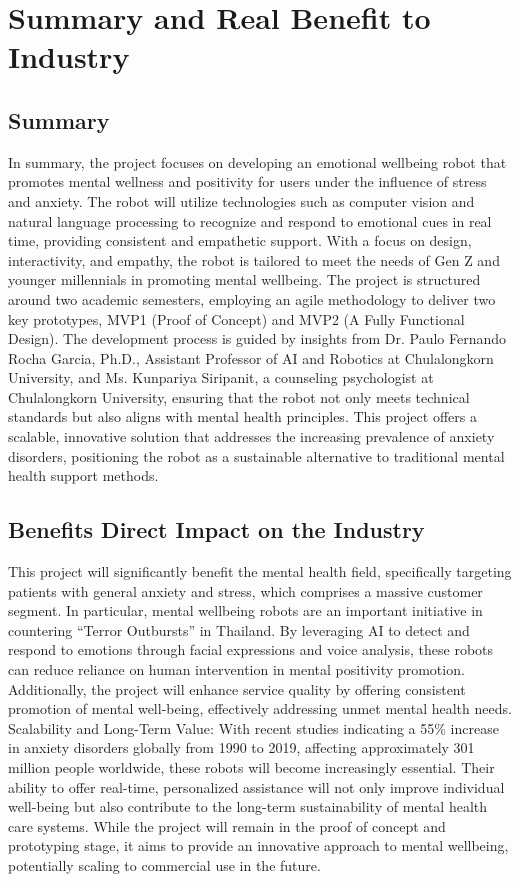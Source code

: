 \section{Summary and Real Benefit to Industry}
\subsection{Summary}
In summary, the project focuses on developing an emotional wellbeing robot that promotes mental wellness and positivity for users under the influence of stress and anxiety. The robot will utilize technologies such as computer vision and natural language processing to recognize and respond to emotional cues in real time, providing consistent and empathetic support. With a focus on design, interactivity, and empathy, the robot is tailored to meet the needs of Gen Z and younger millennials in promoting mental wellbeing. The project is structured around two academic semesters, employing an agile methodology to deliver two key prototypes, MVP1 (Proof of Concept) and MVP2 (A Fully Functional Design). The development process is guided by insights from Dr. Paulo Fernando Rocha Garcia, Ph.D., Assistant Professor of AI and Robotics at Chulalongkorn University, and Ms. Kunpariya Siripanit, a counseling psychologist at Chulalongkorn University, ensuring that the robot not only meets technical standards but also aligns with mental health principles. This project offers a scalable, innovative solution that addresses the increasing prevalence of anxiety disorders, positioning the robot as a sustainable alternative to traditional mental health support methods. 
\subsection{Benefits Direct Impact on the Industry}
This project will significantly benefit the mental health field, specifically targeting patients with general anxiety and stress, which comprises a massive customer segment. In particular, mental wellbeing robots are an important initiative in countering “Terror Outbursts” in Thailand. By leveraging AI to detect and respond to emotions through facial expressions and voice analysis, these robots can reduce reliance on human intervention in mental positivity promotion. Additionally, the project will enhance service quality by offering consistent promotion of mental well-being, effectively addressing unmet mental health needs. Scalability and Long-Term Value: With recent studies indicating a 55\% increase in anxiety disorders globally from 1990 to 2019, affecting approximately 301 million people worldwide, these robots will become increasingly essential. Their ability to offer real-time, personalized assistance will not only improve individual well-being but also contribute to the long-term sustainability of mental health care systems. While the project will remain in the proof of concept and prototyping stage, it aims to provide an innovative approach to mental wellbeing, potentially scaling to commercial use in the future. 

